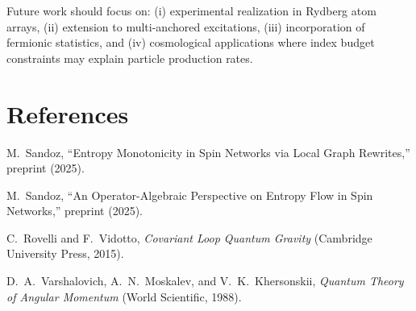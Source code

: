 \documentclass[11pt]{article}
\theoremstyle{plain}
\theoremstyle{definition}
\begin{document}
Future work should focus on: (i) experimental realization in Rydberg atom arrays, (ii) extension to multi-anchored excitations, (iii) incorporation of fermionic statistics, and (iv) cosmological applications where index budget constraints may explain particle production rates.

\section*{References}
\begin{thebibliography}{99}

  M.~Sandoz,
  ``Entropy Monotonicity in Spin Networks via Local Graph Rewrites,''
  preprint (2025).

  M.~Sandoz,
  ``An Operator-Algebraic Perspective on Entropy Flow in Spin Networks,''
  preprint (2025).

  C.~Rovelli and F.~Vidotto,
  \emph{Covariant Loop Quantum Gravity} (Cambridge University Press, 2015).

  D.~A.~Varshalovich, A.~N.~Moskalev, and V.~K.~Khersonskii,
  \emph{Quantum Theory of Angular Momentum} (World Scientific, 1988).

\end{thebibliography}
\end{document}
